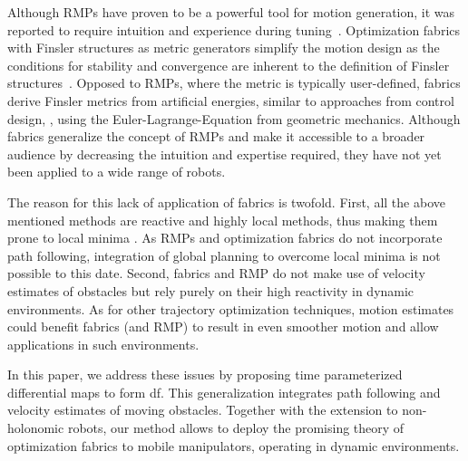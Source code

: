 Although RMPs have proven to be a powerful tool for
motion generation, it was reported to require intuition and experience
during tuning~\cite{Ratliff2020}. Optimization fabrics with Finsler structures
as metric generators simplify the motion design as the conditions for stability
and convergence are inherent to the definition of Finsler
structures~\cite{Ratliff2020,Ratliff2021}. Opposed to RMPs, where the metric is
typically user-defined, fabrics derive Finsler metrics from artificial
energies, similar to approaches from control design, \cite{l2,l3}, using the
Euler-Lagrange-Equation from geometric mechanics. Although fabrics generalize
the concept of RMPs and make it accessible to a broader audience by
decreasing the intuition and expertise required, they have not yet been applied
to a wide range of robots. 

The reason for this lack of application of fabrics is twofold. First, all the
above mentioned methods are reactive and highly local methods, thus making them
prone to local minima \cite{Bhardwaj2021}. As RMPs and optimization
fabrics do not incorporate path following, integration of global
planning to overcome local minima is not possible to this date. Second, fabrics
and RMP do not make use of velocity estimates of obstacles but rely purely on
their high reactivity in dynamic environments. As for other trajectory
optimization techniques, motion estimates could benefit fabrics (and RMP) to
result in even smoother motion and allow applications in such environments. 

In this paper, we address these issues by proposing time parameterized
differential maps to form \acl{df}. This generalization integrates
path following and velocity estimates of moving
obstacles. Together with the extension to non\hyp{}holonomic robots, our method
allows to deploy the promising theory of optimization fabrics to mobile
manipulators, operating in dynamic environments.

